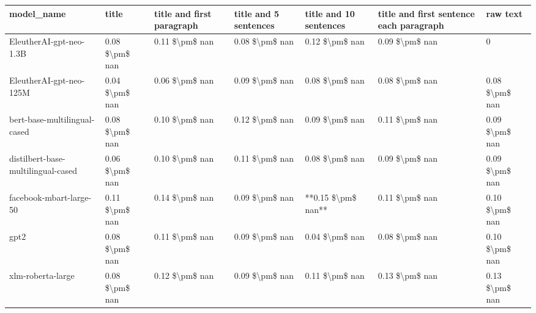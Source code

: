 \begin{tabular}{lllllll}
\toprule
                        model\_name &          title & title and first paragraph & title and 5 sentences & title and 10 sentences & title and first sentence each paragraph &       raw text \\
\midrule
           EleutherAI-gpt-neo-1.3B & 0.08 \$\textbackslash pm\$ nan &            0.11 \$\textbackslash pm\$ nan &        0.08 \$\textbackslash pm\$ nan &         0.12 \$\textbackslash pm\$ nan &                          0.09 \$\textbackslash pm\$ nan &              0 \\
           EleutherAI-gpt-neo-125M & 0.04 \$\textbackslash pm\$ nan &            0.06 \$\textbackslash pm\$ nan &        0.09 \$\textbackslash pm\$ nan &         0.08 \$\textbackslash pm\$ nan &                          0.08 \$\textbackslash pm\$ nan & 0.08 \$\textbackslash pm\$ nan \\
      bert-base-multilingual-cased & 0.08 \$\textbackslash pm\$ nan &            0.10 \$\textbackslash pm\$ nan &        0.12 \$\textbackslash pm\$ nan &         0.09 \$\textbackslash pm\$ nan &                          0.11 \$\textbackslash pm\$ nan & 0.09 \$\textbackslash pm\$ nan \\
distilbert-base-multilingual-cased & 0.06 \$\textbackslash pm\$ nan &            0.10 \$\textbackslash pm\$ nan &        0.11 \$\textbackslash pm\$ nan &         0.08 \$\textbackslash pm\$ nan &                          0.09 \$\textbackslash pm\$ nan & 0.09 \$\textbackslash pm\$ nan \\
           facebook-mbart-large-50 & 0.11 \$\textbackslash pm\$ nan &            0.14 \$\textbackslash pm\$ nan &        0.09 \$\textbackslash pm\$ nan &     **0.15 \$\textbackslash pm\$ nan** &                          0.11 \$\textbackslash pm\$ nan & 0.10 \$\textbackslash pm\$ nan \\
                              gpt2 & 0.08 \$\textbackslash pm\$ nan &            0.11 \$\textbackslash pm\$ nan &        0.09 \$\textbackslash pm\$ nan &         0.04 \$\textbackslash pm\$ nan &                          0.08 \$\textbackslash pm\$ nan & 0.10 \$\textbackslash pm\$ nan \\
                 xlm-roberta-large & 0.08 \$\textbackslash pm\$ nan &            0.12 \$\textbackslash pm\$ nan &        0.09 \$\textbackslash pm\$ nan &         0.11 \$\textbackslash pm\$ nan &                          0.13 \$\textbackslash pm\$ nan & 0.13 \$\textbackslash pm\$ nan \\
\bottomrule
\end{tabular}
